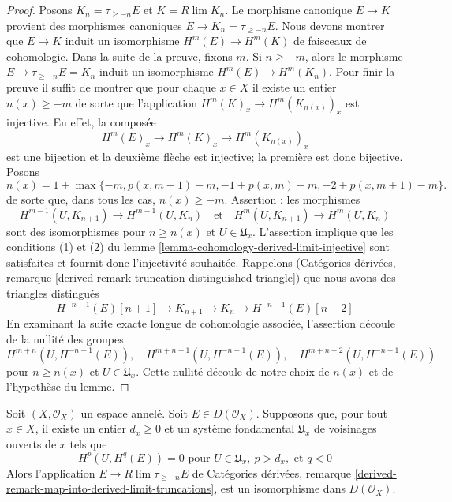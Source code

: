 \begin{proof}

Posons $K_n = \tau_{\geq -n}E$ et $K = R\lim K_n$. Le morphisme canonique $E \to K$
provient des morphismes canoniques $E \to K_n = \tau_{\geq -n}E$. Nous devons montrer que $E \to K$ induit un isomorphisme
$H^m(E) \to H^m(K)$ de faisceaux de cohomologie. Dans la suite de la preuve, fixons $m$. Si $n \geq -m$, alors le morphisme $E \to \tau_{\geq -n}E = K_n$ induit un isomorphisme
$H^m(E) \to H^m(K_n)$. Pour finir la preuve il suffit de montrer que pour chaque $x \in X$
il existe un entier $n(x) \geq -m$ de sorte que l'application
$H^m(K)_x \to H^m(K_{n(x)})_x$ est injective. En effet, la composée
$$
H^m(E)_x \to H^m(K)_x \to H^m(K_{n(x)})_x
$$
est une bijection et la deuxième flèche est injective; la première est donc bijective. Posons
$$
n(x) = 1 + \max\{-m, p(x, m - 1) - m, -1 + p(x, m) - m, -2 + p(x, m + 1) - m\}.
$$
de sorte que, dans tous les cas, $n(x) \geq -m$. Assertion : les morphismes
$$
H^{m - 1}(U, K_{n + 1}) \to H^{m - 1}(U, K_n)
\quad\text{et}\quad
H^m(U, K_{n + 1}) \to H^m(U, K_n)
$$
sont des isomorphismes pour $n \geq n(x)$ et $U \in \mathfrak{U}_x$. L'assertion implique que les conditions (1) et (2) du lemme \ref{lemma-cohomology-derived-limit-injective}
sont satisfaites et fournit donc l'injectivité souhaitée. Rappelons (Catégories dérivées, remarque
\ref{derived-remark-truncation-distinguished-triangle}) que nous avons des triangles distingués
$$
H^{-n - 1}(E)[n + 1] \to
K_{n + 1} \to K_n \to H^{-n - 1}(E)[n + 2]
$$
En examinant la suite exacte longue de cohomologie associée, l'assertion découle de la nullité des groupes
$$
H^{m + n}(U, H^{-n - 1}(E)),\quad
H^{m + n + 1}(U, H^{-n - 1}(E)),\quad
H^{m + n + 2}(U, H^{-n - 1}(E))
$$
pour $n \geq n(x)$ et $U \in \mathfrak{U}_x$. Cette nullité découle de notre choix de $n(x)$
et de l'hypothèse du lemme.

\end{proof}

\begin{lemma}

\label{lemma-is-limit-spaltenstein}

\begin{reference}
\cite[proposition 3.13]{Spaltenstein}
\end{reference}
Soit $(X, \mathcal{O}_X)$ un espace annelé. Soit $E \in D(\mathcal{O}_X)$. Supposons que, pour tout $x \in X$, il existe un entier $d_x \geq 0$ et un système fondamental $\mathfrak{U}_x$ de voisinages ouverts de $x$ tels que $$
H^p(U, H^q(E)) = 0 \text{ pour }
U \in \mathfrak{U}_x,\ p > d_x, \text{ et }q < 0
$$ Alors l'application $E \to R\lim \tau_{\geq -n} E$ de Catégories dérivées, remarque \ref{derived-remark-map-into-derived-limit-truncations}, est un isomorphisme dans $D(\mathcal{O}_X)$.
\end{lemma}

